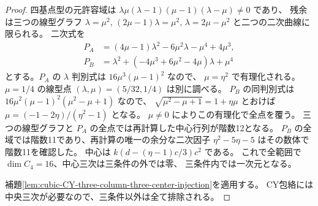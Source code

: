 \begin{proof}
四基点型の元許容域は
$\lambda\mu(\lambda-1)(\mu-1)(\lambda-\mu)\ne0$ であり、
残余は三つの線型グラフ
$\lambda=\mu^2,\, (2\mu-1)\lambda=\mu^2,\,\lambda=2\mu-\mu^2$
と二つの二次曲線に限られる。
二次式を
\begin{align*}
 P_A&=(4\mu-1)\lambda^2-6\mu^2\lambda-\mu^4+4\mu^3,\\
 P_B&=\lambda^2+(-4\mu^3+6\mu^2-4\mu)\lambda+\mu^4
\end{align*}
とする。$P_A$ の $\lambda$ 判別式は $16\mu^3(\mu-1)^2$ なので、
$\mu=\eta^2$ で有理化される。
$\mu=1/4$ の線型点 $(\lambda,\mu)=(5/32,1/4)$ は別に調べる。
$P_B$ の同判別式は $16\mu^2(\mu-1)^2(\mu^2-\mu+1)$ なので、
$\sqrt{\mu^2-\mu+1}=1+\eta\mu$ とおけば
$\mu=(-1-2\eta)/(\eta^2-1)$ となる。
$\mu\ne0$ によりこの有理化で全点を覆う。
三つの線型グラフと $P_A$ の全点では再計算した中心行列が階数12となる。
$P_B$ の全域では階数11であり、再計算の唯一の余分な二次因子
$\eta^2-5\eta-5$ はその数体で階数11を確認した。
中心は $k(d-(\eta-1)c/3)c^2$ である。
これで全範囲で $\dim C_4=16$、中心三次は三条件の外では零、
三条件内では一次元となる。

補題\ref{lem:cubic-CY-three-column-three-center-injection}を適用する。
CY包絡には中央三次が必要なので、三条件以外は全て排除される。
\end{proof}

